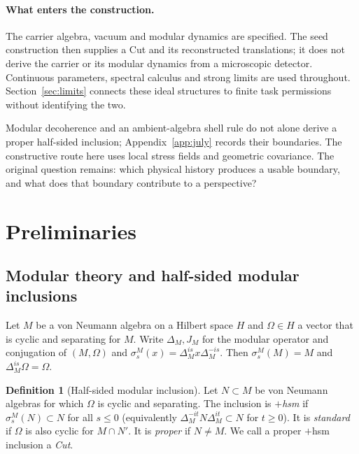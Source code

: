 \documentclass[12pt]{article}
\theoremstyle{definition}
\newtheorem{definition}[theorem]{Definition}
\theoremstyle{remark}
\begin{document}
\paragraph{What enters the construction.} The carrier algebra, vacuum and
modular dynamics are specified. The seed construction then supplies a Cut and
its reconstructed translations; it does not derive the carrier or its modular
dynamics from a microscopic detector. Continuous parameters, spectral calculus
and strong limits are used throughout. Section~\ref{sec:limits} connects these
ideal structures to finite task permissions without identifying the two.

Modular decoherence and an ambient-algebra shell rule do not alone derive a
proper half-sided inclusion; Appendix~\ref{app:july} records their boundaries.
The constructive route here uses
local stress fields and geometric covariance. The original question remains:
which physical history produces a usable boundary, and what does that boundary
contribute to a perspective?

\section{Preliminaries}\label{sec:prelim}

\subsection{Modular theory and half-sided modular inclusions}

Let \(M\) be a von Neumann algebra on a Hilbert space \(H\) and \(\Omega\in H\)
a vector that is cyclic and separating for \(M\). Write \(\Delta_M,J_M\) for the
modular operator and conjugation of \((M,\Omega)\) and
\(\sigma^M_s(x)=\Delta_M^{is}x\Delta_M^{-is}\). Then \(\sigma^M_s(M)=M\) and
\(\Delta_M^{is}\Omega=\Omega\).

\begin{definition}[Half-sided modular inclusion]\label{def:hsm}
Let \(N\subset M\) be von Neumann algebras for which \(\Omega\) is cyclic and
separating. The inclusion is \emph{\(+\)hsm} if \(\sigma^M_s(N)\subset N\) for all
\(s\le0\) (equivalently \(\Delta_M^{-it}N\Delta_M^{it}\subset N\) for \(t\ge0\)). It
is \emph{standard} if \(\Omega\) is also cyclic for \(M\cap N'\). It is \emph{proper}
if \(N\ne M\). We call a proper \(+\)hsm inclusion a \emph{Cut}.
\end{definition}
\end{document}
